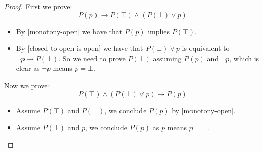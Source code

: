 \begin{proof}
First we prove:
\[P(p) \to P(\top)\land(P(\bot)\lor p)\]
\begin{itemize}
\item By \cref{monotony-open} we have that $P(p)$ implies $P(\top)$.
\item By \cref{closed-to-open-is-open} we have that $P(\bot)\lor p$ is equivalent to $\neg p \to P(\bot)$. So we need to prove $P(\bot)$ assuming $P(p)$ and $\neg p$, which is clear as $\neg p$ means $p=\bot$. 
\end{itemize}
Now we prove:
\[P(\top)\land(P(\bot)\lor p) \to P(p)\]
\begin{itemize}
\item Assume $P(\top)$ and $P(\bot)$, we conclude $P(p)$ by \cref{monotony-open}.
\item Assume $P(\top)$ and $p$, we conclude $P(p)$ as $p$ means $p=\top$.
\end{itemize}
\end{proof}
